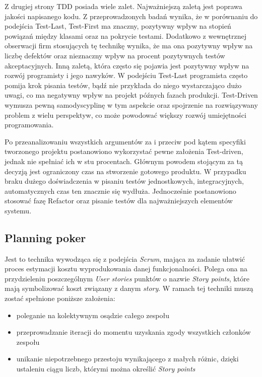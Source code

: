 Z drugiej strony TDD posiada wiele zalet. Najważniejszą zaletą jest poprawa jakości
napisanego kodu\cite{TDD03}. Z przeprowadzonych badań\cite{TDD01} wynika, że w
porównaniu do podejścia Test-Last, Test-First ma znaczny, pozytywny wpływ na stopień
powiązań między klasami oraz na pokrycie testami. Dodatkowo z wewnętrznej obserwacji
firm stosujących tę technikę wynika, że ma ona pozytywny wpływ na liczbę defektów oraz
nieznaczny wpływ na procent pozytywnych testów akceptacyjnych. Inną zaletą, która często
się pojawia jest pozytywny wpływ na rozwój programisty i jego nawyków. W podejściu
Test-Last programista często pomija krok pisania testów, bądź nie przykłada do niego
wystarczająco dużo uwagi, co ma negatywny wpływ na projekt późnych fazach produkcji.
Test-Driven wymusza pewną samodyscyplinę w tym aspekcie oraz spojrzenie na
rozwiązywany problem z wielu perspektyw, co może powodować większy rozwój
umiejętności programowania.

Po przeanalizowaniu wszystkich argumentów za i przeciw pod kątem specyfiki
tworzonego projektu postanowiono wykorzystać pewne założenia Test-driven, jednak nie spełniać ich w stu procentach. Głównym powodem stojącym za tą decyzją jest ograniczony czas na stworzenie gotowego produktu. W przypadku braku dużego doświadczenia w pisaniu testów jednostkowych, integracyjnych, automatycznych czas ten znacznie się wydłuża. Jednocześnie postanowiono stosować fazę Refactor oraz pisanie testów dla najważniejszych elementów systemu.
\subsection{Planning poker}
\label{subsec:planningPoker}
Jest to technika wywodząca się z podejścia \textit{Scrum}, mająca za zadanie ułatwić proces estymacji kosztu wyprodukowania danej funkcjonalności. Polega ona na przydzieleniu poszczególnym \textit{User stories} punktów o nazwie \textit{Story points}, które mają symbolizować koszt związany z danym \textit{story}. W ramach tej techniki muszą zostać spełnione poniższe założenia\cite{AGI01}:
\begin{itemize}
\item poleganie na kolektywnym osądzie całego zespołu
\item przeprowadzanie iteracji do momentu uzyskania zgody wszystkich członków zespołu
\item unikanie niepotrzebnego przestoju wynikającego z małych różnic, dzięki ustaleniu ciągu liczb, którymi można określić \textit{Story points}
\end{itemize}

